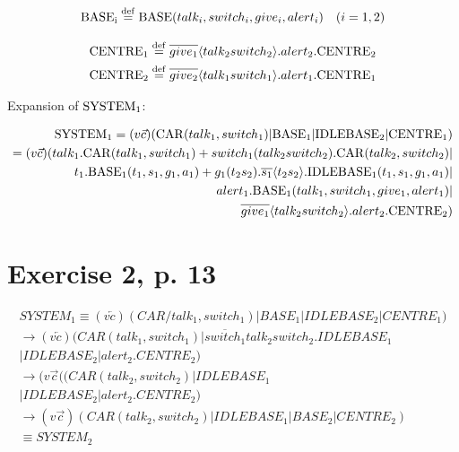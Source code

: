 \documentclass[11pt]{article}
\begin{document}
\begin{equation}
{\rm BASE_i} \stackrel{\mathrm{def}}{=} {\rm BASE}(talk_i , switch_i , give_i , alert_i) \quad (i=1,2)
\end{equation}

\begin{equation}
\begin{split}
{\rm CENTRE_1} \stackrel{\mathrm{def}}{=} \overline{give_1} \langle talk_2 switch_2 \rangle .alert_2.{\rm CENTRE_2} \\ 
{\rm CENTRE_2} \stackrel{\mathrm{def}}{=} \overline{give_2} \langle talk_1 switch_1 \rangle .alert_1.{\rm CENTRE_1}
\end{split}
\end{equation}


Expansion of ${\rm SYSTEM_1}$:

\begin{equation}
\begin{split}
{\rm SYSTEM_1} = (v\vec{c}) ({\rm CAR}(talk_1 , switch_1) | {\rm BASE_1} | {\rm IDLEBASE_2} | {\rm CENTRE_1})\\
= (v\vec{c})( talk_1 . {\rm CAR}(talk_1, switch_1) + switch_1(talk_2 switch_2) . {\rm CAR}(talk_2, switch_2) | \\
t_1 . {\rm BASE_1}(t_1, s_1, g_1, a_1) + g_1(t_2 s_2) . \overline{s_1} \langle t_2 s_2 \rangle . {\rm IDLEBASE_1}(t_1, s_1, g_1, a_1) | \\
alert_1 . {\rm BASE_1}(talk_1, switch_1, give_1, alert_1) | \\
\overline{give_1} \langle talk_2 switch_2 \rangle .alert_2.{\rm CENTRE_2} )
\end{split}
\end{equation}


\section{Exercise 2, p. 13}

\begin{equation}
\begin{split}
SYSTEM_1 \equiv  (v\overleftarrow{c})(CAR/talk_1,switch_1) | BASE_1 | IDLEBASE_2 | CENTRE_1) \\
\rightarrow (v\overleftarrow{c})(CAR(talk_1, switch_1) | \overline{switch_1}talk_2switch_2.IDLEBASE_1 \\
| IDLEBASE_2 | alert_2.CENTRE_2) \\
\rightarrow (v\overrightarrow{c}((CAR(talk_2,switch_2) | IDLEBASE_1 \\
| IDLEBASE_2 | alert_2.CENTRE_2) \\
\rightarrow (v\overrightarrow{c})(CAR(talk_2,switch_2) | IDLEBASE_1 | BASE_2 | CENTRE_2) \\
\equiv SYSTEM_2
\end{split}
\end{equation}
\end{document}

